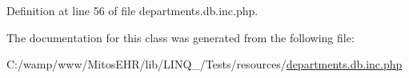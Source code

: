 \-Definition at line 56 of file departments.\-db.\-inc.\-php.



\-The documentation for this class was generated from the following file\-:\begin{DoxyCompactItemize}
\item 
\-C\-:/wamp/www/\-Mitos\-E\-H\-R/lib/\-L\-I\-N\-Q\-\_/\-Tests/resources/\hyperlink{departments_8db_8inc_8php}{departments.\-db.\-inc.\-php}\end{DoxyCompactItemize}
